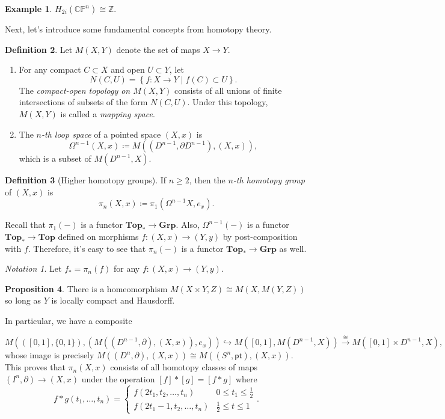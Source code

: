 \documentclass[10pt,letterpaper,cm]{nupset}
\theoremstyle{definition}
\newtheorem{defn}{Definition}[subsection]
\newtheorem{exmp}[defn]{Example}
\theoremstyle{theorem}
\newtheorem{prop}[defn]{Proposition}
\theoremstyle{remark}
\newtheorem*{notation}{Notation}
\newcommand{\CP}{\mathbb{CP}}
\newcommand{\Z}{\mathbb Z}
\newcommand{\1}{\mathbb{1}}
\newcommand{\0}{\vec 0}
\newcommand{\pt}{\mathsf{pt}}
\newcommand{\be}{\begin{enumerate}}
\newcommand{\ee}{\end{enumerate}}
\begin{document}
\smallskip

\begin{exmp}
$H_{2i}(\CP^n) \cong \Z$.
\end{exmp}

\bigskip

Next, let's introduce some fundamental concepts from homotopy theory. 

\begin{defn} Let $M(X, Y)$ denote the set of maps $X \to Y$. 
\be
\item For any compact $C \subset X$ and open $U \subset Y$, let $$N(C, U) = \left\{f : X \to Y \mid f(C) \subset U \right\}  .$$ The \textit{compact-open topology on $M(X, Y)$} consists of all unions of finite intersections of subsets of the form $N(C, U)$. Under this topology, $M(X,Y)$ is called a \textit{mapping space}. 
\item The \textit{$n$-th loop space} of a pointed space $\left(X, x\right)$ is $$\Omega^{n-1}(X, x) \coloneqq M((D^{n-1}, \partial{D^{n-1}}), (X, x)),$$  which is a subset of $M(D^{n-1}, X)$.
\ee 
\end{defn}


\begin{defn}[Higher homotopy groups]
If $n \geq 2$, then the \textit{$n$-th homotopy group} of $\left(X, x\right)$ is $$\pi_n(X,x) \coloneqq \pi_1(\Omega^{n-1}{X}, e_x).$$
\end{defn}

Recall that $\pi_1({-})$ is a functor $\mathbf{Top}_{\ast} \to \mathbf{Grp}$. Also, $\Omega^{n-1}({-})$ is a functor $\mathbf{Top}_{\ast}  \to \mathbf{Top} $ defined on morphisms $f: (X, x) \to (Y, y)$ by post-composition with $f$.
 Therefore, it's easy to see that $\pi_n({-})$ is a functor $\mathbf{Top}_{\ast} \to \mathbf{Grp}$ as well.

\begin{notation} 
Let $f_{\ast} =  \pi_n(f)$ for any $f: (X, x) \to (Y, y)$.
\end{notation}

\begin{prop}
There is a homeomorphism $M(X \times Y, Z) \cong M(X, M(Y, Z))$ so long as $Y$ is locally compact and Hausdorff. 
\end{prop}

In particular, we have a composite 

\[
M((\left[0,1\right], \{0,1\}), (M((D^{n-1}, \partial), (X,x)), e_x)) \hookrightarrow M(\left[0,1\right], M(D^{n-1}, X)) \overset{\cong}{\longrightarrow} M(\left[0,1\right] \times D^{n-1}, X),
\] whose image is precisely $M((D^n, \partial), (X,x)) \cong M((S^n, \pt), (X,x))$. This proves that $\pi_n(X,x)$ consists of all homotopy classes of maps $\left(I^n, \partial\right) \to \left(X,x\right)$ under the operation $\left[f\right] \ast \left[g\right] = \left[f \ast g\right]$ where $$ f \ast g(t_1, \ldots, t_n) = \begin{cases}
      f(2t_1, t_2, \ldots, t_n) & 0\leq t_1 \leq \frac{1}{2}
      \\ f(2t_1-1, t_2, \ldots, t_n) & \frac{1}{2} \leq t\leq 1
\end{cases}    .$$ 
\end{document}
